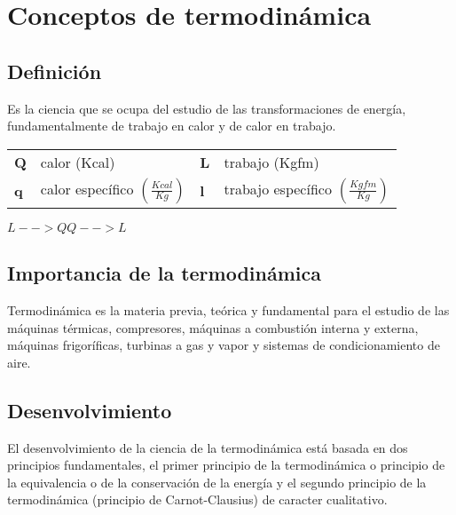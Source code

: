 \section{Conceptos de termodin\'amica}
	
	\subsection{Definici\'on}
	Es la ciencia que se ocupa del estudio de las transformaciones 
	de energ\'ia, fundamentalmente de trabajo en calor y de calor en trabajo.
	\begin{center}
		\begin{tabular}{l l || l l}
			\textbf{Q} & calor (Kcal) & \textbf{L} & trabajo (Kgfm) \\
			\textbf{q} & calor espec\'ifico 
				\begin{math} 
					\left(\frac{Kcal}{Kg}\right)
				\end{math} 	

						& \textbf{l} & trabajo espec\'ifico
							\begin{math}
								\left(\frac{Kgfm}{Kg}\right)
							\end{math}

		\end{tabular}
		\begin{math}
			L  - - >  Q   %
			Q  - - >  L   
		\end{math}
	\end{center}
	
	\subsection{Importancia de la termodin\'amica}
	Termodin\'amica es la materia previa, te\'orica y fundamental para el estudio
	de las m\'aquinas t\'ermicas, compresores, m\'aquinas a combusti\'on interna 
	y externa, m\'aquinas frigor\'ificas, turbinas a gas y vapor y sistemas de 
	condicionamiento de aire.
	
	\subsection{Desenvolvimiento}
	El desenvolvimiento de la ciencia de la termodin\'amica est\'a basada en dos 
	principios fundamentales, el primer principio de la termodin\'amica o principio de
	la equivalencia o de la conservaci\'on de la energ\'ia y el segundo principio 
	de la termodin\'amica (principio de Carnot-Clausius) de caracter cualitativo.
